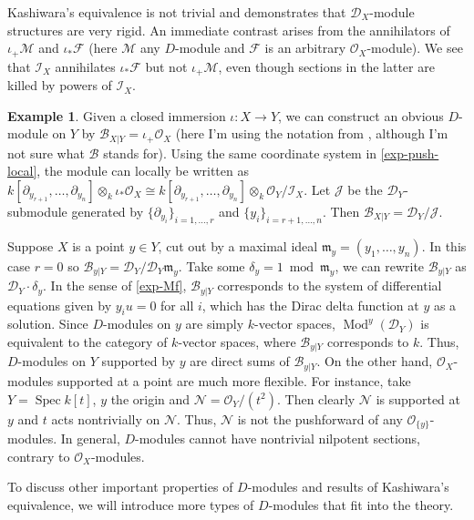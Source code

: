 \documentclass[11pt, a4paper]{article}
\theoremstyle{definition}
\newtheorem{example}[theorem]{Example}
\newcommand{\Spec}[0]{\operatorname{Spec}}
\newcommand{\Mod}{\operatorname{Mod}}
\begin{document}
    Kashiwara's equivalence is not trivial and demonstrates that $\mathcal D_X$-module structures are very rigid. An immediate contrast arises from the annihilators of $\iota_+\mathcal M$ and $\iota_*\mathcal F$ (here $\mathcal M$ any $D$-module and $\mathcal F$ is an arbitrary $\mathcal O_X$-module). We see that $\mathcal I_X$ annihilates $\iota_*\mathcal F$ but not $\iota_+\mathcal M$, even though sections in the latter are killed by powers of $\mathcal I_X$.
    \begin{example}\label{exp-construct-by-push}
        Given a closed immersion $\iota:X\to Y$, we can construct an obvious $D$-module on $Y$ by $\mathcal B_{X|Y}=\iota_+\mathcal O_X$ (here I'm using the notation from \cite{htt-d-modules, ginzburg-notes}, although I'm not sure what $\mathcal B$ stands for). Using the same coordinate system in \cref{exp-push-local}, the module can locally be written as $k[\partial_{y_{r+1}},\dots,\partial_{y_n}]\otimes_k\iota_*\mathcal O_X\cong k[\partial_{y_{r+1}},\dots,\partial_{y_n}]\otimes_k\mathcal O_Y/\mathcal I_X$. Let $\mathcal J$ be the $\mathcal D_Y$-submodule generated by $\{\partial_{y_i}\}_{i=1,\dots, r}$ and $\{y_i\}_{i=r+1,\dots, n}$. Then $\mathcal B_{X|Y}=\mathcal D_Y/\mathcal J$.

        Suppose $X$ is a point $y\in Y$, cut out by a maximal ideal $\mathfrak m_y=(y_1,\dots, y_n)$. In this case $r=0$ so $\mathcal B_{y|Y}=\mathcal D_Y/\mathcal D_Y\mathfrak m_y$. Take some $\delta_y=1\bmod{\mathfrak m_y}$, we can rewrite $\mathcal B_{y|Y}$ as $\mathcal D_Y\cdot\delta_y$. In the sense of \cref{exp-Mf}, $\mathcal B_{y|Y}$ corresponds to the system of differential equations given by $y_iu=0$ for all $i$, which has the Dirac delta function at $y$ as a solution. Since $D$-modules on $y$ are simply $k$-vector spaces, $\Mod^y(\mathcal D_Y)$ is equivalent to the category of $k$-vector spaces, where $\mathcal B_{y|Y}$ corresponds to $k$. Thus, $D$-modules on $Y$ supported by $y$ are direct sums of $\mathcal B_{y|Y}$. On the other hand, $\mathcal O_X$-modules supported at a point are much more flexible. For instance, take $Y=\Spec k[t]$, $y$ the origin and $\mathcal N=\mathcal O_Y/(t^2)$. Then clearly $\mathcal N$ is supported at $y$ and $t$ acts nontrivially on $\mathcal N$. Thus, $\mathcal N$ is not the pushforward of any $\mathcal O_{\{y\}}$-modules. In general, $D$-modules cannot have nontrivial nilpotent sections, contrary to $\mathcal O_X$-modules.
    \end{example}
    To discuss other important properties of $D$-modules and results of Kashiwara's equivalence, we will introduce more types of $D$-modules that fit into the theory.
\end{document}
